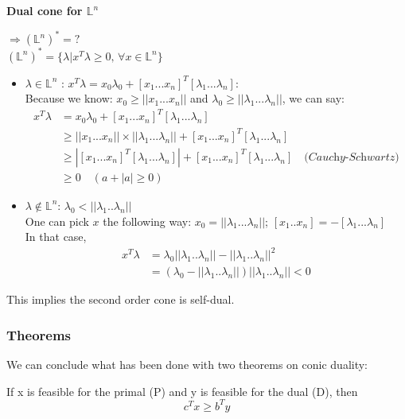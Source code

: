 \begin{example}
\begin{leftbar} 
\textbf{Dual cone for $\mathbb{L}^n$}

$\Rightarrow(\mathbb{L}^n)^*=?$\\
$(\mathbb{L}^n)^*=\{\lambda | x^T \lambda \geq 0\textrm{, } \forall x \in \mathbb{L}^n \}$
\begin{itemize}
\item $\lambda \in \mathbb{L}^n$ : $x^T\lambda = x_0\lambda_0 + [x_1 ... x_n]^T[\lambda_1 ... \lambda_n]$:\\
Because we know: $x_0\geq ||x_1...x_n||$ and $\lambda_0 \geq ||\lambda_1...\lambda_n||$, we can say: \begin{align*}
x^T\lambda &= x_0\lambda_0 + [x_1 ... x_n]^T[\lambda_1 ... \lambda_n]\\
& \geq||x_1...x_n|| \times ||\lambda_1...\lambda_n||+[x_1 ... x_n]^T[\lambda_1 ... \lambda_n]\\
 &\geq |[x_1 ... x_n]^T[\lambda_1 ... \lambda_n]|+[x_1 ... x_n]^T[\lambda_1 ... \lambda_n] \quad \textit{(Cauchy-Schwartz)}\\
 & \geq 0 \quad{(a+|a|\geq 0)}
\end{align*}
\item $\lambda \notin \mathbb{L}^n$: $\lambda_0 < ||\lambda_1 ..  \lambda_n||$ \\
One can pick $x$ the following way: $x_0 = ||\lambda_1...\lambda_n||$; $[x_1..x_n] = -[\lambda_1 ... \lambda_n]$\\
In that case, \begin{align*}
x^T\lambda &= \lambda_0||\lambda_1 ..  \lambda_n|| - ||\lambda_1 ..  \lambda_n||^2\\
&= (\lambda_0 - ||\lambda_1 ..  \lambda_n||)||\lambda_1 ..  \lambda_n||<0
\end{align*}
\end{itemize}
This implies the second order cone is self-dual.

\end{leftbar}
\end{example}

\subsubsection{Theorems}
We can conclude what has been done with two theorems on conic duality:

\begin{theorem}
If x is feasible for the primal (P) and y is feasible for the dual (D), then $$c^Tx\ge b^Ty$$
\end{theorem}

%
